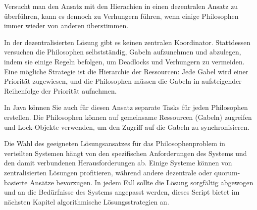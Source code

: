 Versucht man den Ansatz mit den Hierachien in einen dezentralen Ansatz zu überführen, kann es dennoch zu Verhungern führen, wenn einige Philosophen immer wieder von anderen überstimmen.

In der dezentralisierten Lösung gibt es keinen zentralen Koordinator. Stattdessen versuchen die Philosophen selbstständig, Gabeln aufzunehmen und abzulegen, indem sie einige Regeln befolgen, um Deadlocks und Verhungern zu vermeiden. Eine mögliche Strategie ist die Hierarchie der Ressourcen: Jede Gabel wird einer Priorität zugewiesen, und die Philosophen müssen die Gabeln in aufsteigender Reihenfolge der Priorität aufnehmen.

In Java können Sie auch für diesen Ansatz separate Tasks für jeden Philosophen erstellen. Die Philosophen können auf gemeinsame Ressourcen (Gabeln) zugreifen und Lock-Objekte verwenden, um den Zugriff auf die Gabeln zu synchronisieren.

Die Wahl des geeigneten Lösungsansatzes für das Philosophenproblem in verteilten Systemen hängt von den spezifischen Anforderungen des Systems und den damit verbundenen Herausforderungen ab. Einige Systeme können von zentralisierten Lösungen profitieren, während andere dezentrale oder quorum-basierte Ansätze bevorzugen. In jedem Fall sollte die Lösung sorgfältig abgewogen und an die Bedürfnisse des Systems angepasst werden, dieses Script bietet im nächsten Kapitel algorithmische Lösungsstrategien an.




